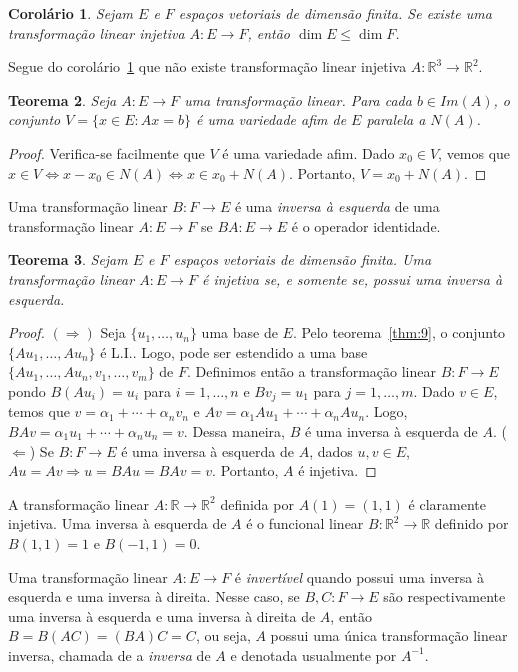 \documentclass[12pt,a4paper]{article}
\newcommand{\R}{\mathbb{R}}
\newtheorem{thm}{Teorema}[section]
\newtheorem{cor}[thm]{Corolário}
\theoremstyle{definition}
\begin{document}
\begin{cor}
  \label{thm:10}
  Sejam $E$ e $F$ espaços vetoriais de dimensão finita. Se existe uma
  transformação linear injetiva $A:E\to F$, então $\dim E\le \dim F$.
\end{cor}

Segue do corolário~\ref{thm:10} que não existe transformação linear
injetiva $A:\R^3\to\R^2$.

\begin{thm}
  \label{thm:11}
  Seja $A:E\to F$ uma transformação linear. Para cada $b\in Im(A)$, o
  conjunto $V=\{x\in E:Ax=b\}$ é uma variedade afim de $E$ paralela a
  $N(A)$.
\end{thm}
\begin{proof}
  Verifica-se facilmente que $V$ é uma variedade afim. Dado
  $x_0\in V$, vemos que
  $x\in V\Leftrightarrow x-x_0\in N(A)\Leftrightarrow x\in
  x_0+N(A)$. Portanto, $V=x_0+N(A)$.
\end{proof}

Uma transformação linear $B:F\to E$ é uma \textit{inversa à esquerda}
de uma transformação linear $A:E\to F$ se $BA:E\to E$ é o operador
identidade.

\begin{thm}
  \label{thm:12}
  Sejam $E$ e $F$ espaços vetoriais de dimensão finita. Uma
  transformação linear $A:E\to F$ é injetiva se, e somente se, possui
  uma inversa à esquerda.
\end{thm}
\begin{proof}
  $(\Rightarrow)$ Seja $\{u_1,\ldots,u_n\}$ uma base de $E$. Pelo
  teorema~\ref{thm:9}, o conjunto $\{Au_1,\ldots,Au_n\}$ é
  L.I.. Logo, pode ser estendido a uma base
  $\{Au_1,\ldots,Au_n,v_1,\ldots,v_m\}$ de $F$.  Definimos então a
  transformação linear $B:F\to E$ pondo $B(Au_i)=u_i$ para
  $i=1,\ldots,n$ e $Bv_j=u_1$ para $j=1,\ldots,m$. Dado $v\in E$,
  temos que $v=\alpha_1+\cdots+\alpha_nv_n$ e
  $Av=\alpha_1Au_1+\cdots+\alpha_nAu_n$. Logo,
  $BAv=\alpha_1u_1+\cdots+\alpha_nu_n=v$. Dessa maneira, $B$ é uma
  inversa à esquerda de $A$. ($\Leftarrow$) Se $B:F\to E$ é uma
  inversa à esquerda de $A$, dados $u,v\in E$,
  $Au=Av\Rightarrow u=BAu=BAv=v$. Portanto, $A$ é injetiva.
\end{proof}

A transformação linear $A:\R\to \R^2$ definida por $A(1)=(1,1)$ é
claramente injetiva. Uma inversa à esquerda de $A$ é o funcional
linear $B:\R^2\to\R$ definido por $B(1,1)=1$ e $B(-1,1)=0$.

Uma transformação linear $A:E\to F$ é \textit{invertível} quando
possui uma inversa à esquerda e uma inversa à direita. Nesse caso, se
$B,C:F\to E$ são respectivamente uma inversa à esquerda e uma inversa
à direita de $A$, então $B=B(AC)=(BA)C=C$, ou seja, $A$ possui uma
única transformação linear inversa, chamada de a \textit{inversa} de
$A$ e denotada usualmente por $A^{-1}$.
\end{document}
